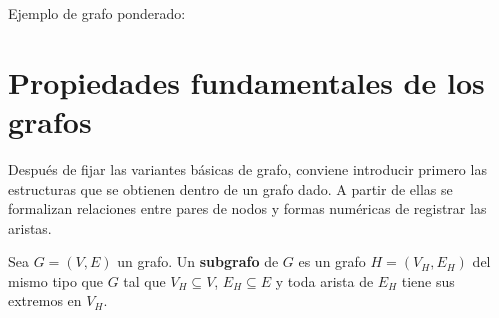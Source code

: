         \begin{ejemplo}
            Ejemplo de grafo ponderado:

            \begin{center}
            \end{center}
        \end{ejemplo}

    \section{Propiedades fundamentales de los grafos}

        Después de fijar las variantes básicas de grafo, conviene introducir primero las estructuras que se obtienen dentro de un grafo dado. A partir de ellas se formalizan relaciones entre pares de nodos y formas numéricas de registrar las aristas.

        \begin{definicion}[Subgrafo]
            Sea $G=(V,E)$ un grafo. Un \textbf{subgrafo} de $G$ es un grafo $H=(V_H,E_H)$ del mismo tipo que $G$ tal que $V_H\subseteq V$, $E_H\subseteq E$ y toda arista de $E_H$ tiene sus extremos en $V_H$.
        \end{definicion}

